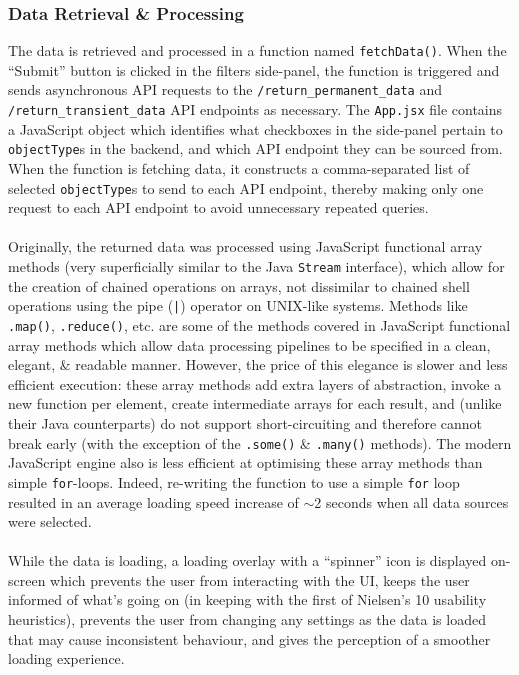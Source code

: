 \documentclass[a4paper,11pt]{report}
\begin{document}
\subsubsection{Data Retrieval \& Processing}
The data is retrieved and processed in a function named \texttt{fetchData()}.
When the ``Submit'' button is clicked in the filters side-panel, the function is triggered and sends asynchronous API requests to the \verb|/return_permanent_data| and \verb|/return_transient_data| API endpoints as necessary.
The \verb|App.jsx| file contains a JavaScript object which identifies what checkboxes in the side-panel pertain to \verb|objectType|s in the backend, and which API endpoint they can be sourced from.
When the function is fetching data, it constructs a comma-separated list of selected \verb|objectType|s to send to each API endpoint, thereby making only one request to each API endpoint to avoid unnecessary repeated queries.
\\\\
Originally, the returned data was processed using JavaScript functional array methods\supercite{arraymethods} (very superficially similar to the Java \texttt{Stream}\supercite{javastream} interface), which allow for the creation of chained operations on arrays, not dissimilar to chained shell operations using the pipe (\texttt{|}) operator on UNIX-like systems\supercite{redhatpipe}.
Methods like \texttt{.map()}, \texttt{.reduce()}, etc. are some of the methods covered in JavaScript functional array methods which allow data processing pipelines to be specified in a clean, elegant, \& readable manner.
However, the price of this elegance is slower and less efficient execution:
these array methods add extra layers of abstraction, invoke a new function per element, create intermediate arrays for each result, and (unlike their Java counterparts) do not support short-circuiting and therefore cannot break early (with the exception of the \texttt{.some()} \& \texttt{.many()} methods)\supercite{shortcircuit}.
The modern JavaScript engine also is less efficient at optimising these array methods than simple \texttt{for}-loops\supercite{jsmethodopti}.
Indeed, re-writing the function to use a simple \texttt{for} loop resulted in an average loading speed increase of $\sim$2 seconds when all data sources were selected. 
\\\\
While the data is loading, a loading overlay with a ``spinner'' icon is displayed on-screen which prevents the user from interacting with the UI, keeps the user informed of what's going on (in keeping with the first of Nielsen's 10 usability heuristics\supercite{nielsenheuristics}), prevents the user from changing any settings as the data is loaded that may cause inconsistent behaviour, and gives the perception of a smoother loading experience.
\end{document}
